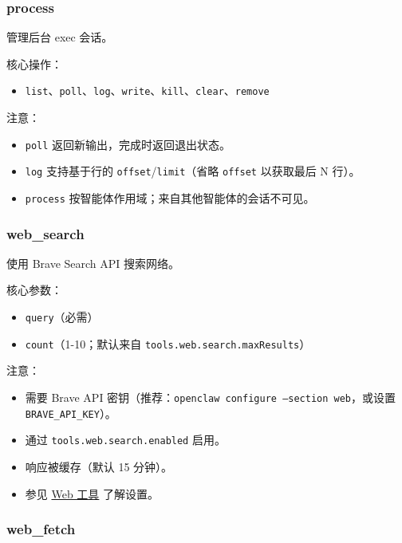 \subsubsection{process}


管理后台 exec 会话。

核心操作：

\begin{itemize}
  \item \texttt{list}、\texttt{poll}、\texttt{log}、\texttt{write}、\texttt{kill}、\texttt{clear}、\texttt{remove}
\end{itemize}


注意：

\begin{itemize}
  \item \texttt{poll} 返回新输出，完成时返回退出状态。
  \item \texttt{log} 支持基于行的 \texttt{offset}/\texttt{limit}（省略 \texttt{offset} 以获取最后 N 行）。
  \item \texttt{process} 按智能体作用域；来自其他智能体的会话不可见。
\end{itemize}


\subsubsection{web\_search}


使用 Brave Search API 搜索网络。

核心参数：

\begin{itemize}
  \item \texttt{query}（必需）
  \item \texttt{count}（1-10；默认来自 \texttt{tools.web.search.maxResults}）
\end{itemize}


注意：

\begin{itemize}
  \item 需要 Brave API 密钥（推荐：\texttt{openclaw configure --section web}，或设置 \texttt{BRAVE\_API\_KEY}）。
  \item 通过 \texttt{tools.web.search.enabled} 启用。
  \item 响应被缓存（默认 15 分钟）。
  \item 参见 \href{/tools/web}{Web 工具} 了解设置。
\end{itemize}


\subsubsection{web\_fetch}


